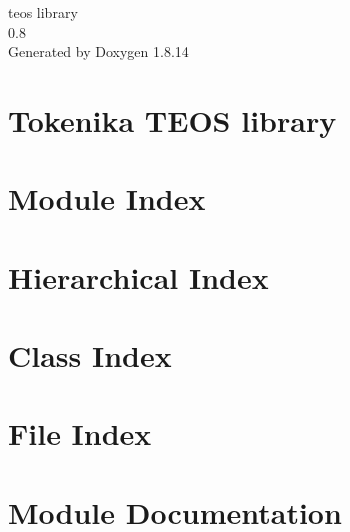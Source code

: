 \documentclass[twoside]{book}
\newcommand{\+}{\discretionary{\mbox{\scriptsize$\hookleftarrow$}}{}{}}
\newcommand{\clearemptydoublepage}{%
  \newpage{\pagestyle{empty}\cleardoublepage}%
}
\begin{document}
\hypersetup{pageanchor=false,
             bookmarksnumbered=true,
             pdfencoding=unicode
            }
\begin{titlepage}
\vspace*{7cm}
\begin{center}%
{\Large teos library \\[1ex]\large 0.\+8 }\\
\vspace*{1cm}
{\large Generated by Doxygen 1.8.14}\\
\end{center}
\end{titlepage}
\clearemptydoublepage
{}
\tableofcontents
\clearemptydoublepage
{}
\hypersetup{pageanchor=true}

\chapter{Tokenika T\+E\+OS library}
\label{index}\hypertarget{index}{}
\chapter{Module Index}

\chapter{Hierarchical Index}

\chapter{Class Index}

\chapter{File Index}

\chapter{Module Documentation}

\end{document}

